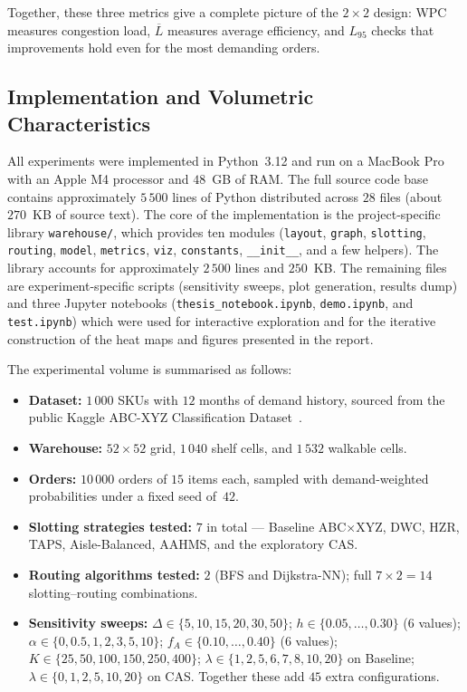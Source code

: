 \documentclass[12pt,a4paper]{article}
\begin{document}
Together, these three metrics give a complete picture of the $2 \times 2$ design:
WPC measures congestion load, $\overline{L}$ measures average efficiency, and
$L_{95}$ checks that improvements hold even for the most demanding orders.

\subsection{Implementation and Volumetric Characteristics}
\label{sec:volumetric}

All experiments were implemented in Python~3.12 and run on a MacBook Pro
with an Apple M4 processor and $48$~GB of RAM. The full source code base
contains approximately $5\,500$ lines of Python distributed across
$28$ files (about $270$~KB of source text). The core of the implementation
is the project-specific library \texttt{warehouse/}, which provides ten
modules (\texttt{layout}, \texttt{graph}, \texttt{slotting},
\texttt{routing}, \texttt{model}, \texttt{metrics}, \texttt{viz},
\texttt{constants}, \texttt{\_\_init\_\_}, and a few helpers).
The library accounts for approximately $2\,500$ lines and $250$~KB.
The remaining files are experiment-specific scripts (sensitivity sweeps,
plot generation, results dump) and three Jupyter notebooks
(\texttt{thesis\_notebook.ipynb}, \texttt{demo.ipynb}, and
\texttt{test.ipynb}) which were used for interactive exploration and
for the iterative construction of the heat maps and figures presented
in the report.

The experimental volume is summarised as follows:
\begin{itemize}
  \item \textbf{Dataset:} $1\,000$ SKUs with $12$ months of demand
        history, sourced from the public Kaggle ABC-XYZ Classification
        Dataset~\cite{ref6}.
  \item \textbf{Warehouse:} $52 \times 52$ grid, $1\,040$ shelf cells,
        and $1\,532$ walkable cells.
  \item \textbf{Orders:} $10\,000$ orders of $15$ items each, sampled
        with demand-weighted probabilities under a fixed seed of~$42$.
  \item \textbf{Slotting strategies tested:} $7$ in total --- Baseline
        ABC$\times$XYZ, DWC, HZR, TAPS, Aisle-Balanced, AAHMS, and
        the exploratory CAS.
  \item \textbf{Routing algorithms tested:} $2$ (BFS and Dijkstra-NN);
        full $7 \times 2 = 14$ slotting--routing combinations.
  \item \textbf{Sensitivity sweeps:} $\Delta \in \{5,10,15,20,30,50\}$;
        $h \in \{0.05,\ldots,0.30\}$ ($6$ values);
        $\alpha \in \{0,0.5,1,2,3,5,10\}$;
        $f_A \in \{0.10,\ldots,0.40\}$ ($6$ values);
        $K \in \{25,50,100,150,250,400\}$;
        $\lambda \in \{1,2,5,6,7,8,10,20\}$ on Baseline;
        $\lambda \in \{0,1,2,5,10,20\}$ on CAS.
        Together these add $45$ extra configurations.
\end{itemize}
\end{document}

